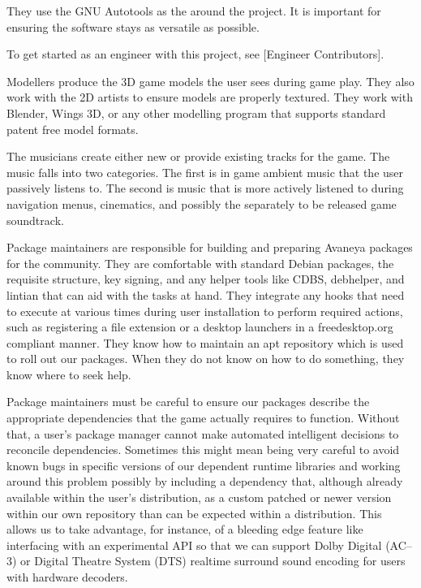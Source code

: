 They use the GNU Autotools as the  around the project. It is important for ensuring the software stays as versatile as possible. 

To get started as an engineer with this project, see [Engineer Contributors].


Modellers produce the 3D game models the user sees during game play. They also work with the 2D artists to ensure models are properly textured. They work with Blender, Wings 3D, or any other modelling program that supports standard patent free model formats.


The musicians create either new or provide existing tracks for the game. The music falls into two categories. The first is in game ambient music that the user passively listens to. The second is music that is more actively listened to during navigation menus, cinematics, and possibly the separately to be released game soundtrack.


Package maintainers are responsible for building and preparing Avaneya packages for the community. They are comfortable with standard Debian packages, the requisite structure, key signing, and any helper tools like CDBS, debhelper, and lintian that can aid with the tasks at hand. They integrate any hooks that need to execute at various times during user installation to perform required actions, such as registering a file extension or a desktop launchers in a freedesktop.org compliant manner. They know how to maintain an apt repository which is used to roll out our packages. When they do not know on how to do something, they know where to seek help.

Package maintainers must be careful to ensure our packages describe the appropriate dependencies that the game actually requires to function. Without that, a user's package manager cannot make automated intelligent decisions to reconcile dependencies. Sometimes this might mean being very careful to avoid known bugs in specific versions of our dependent runtime libraries and working around this problem possibly by including a dependency that, although already available within the user's distribution, as a custom patched or newer version within our own repository than can be expected within a distribution. This allows us to take advantage, for instance, of a bleeding edge feature like interfacing with an experimental API so that we can support Dolby Digital\high{\registered} (AC--3) or Digital Theatre System (DTS)\high{\registered} realtime surround sound encoding for users with hardware decoders.

